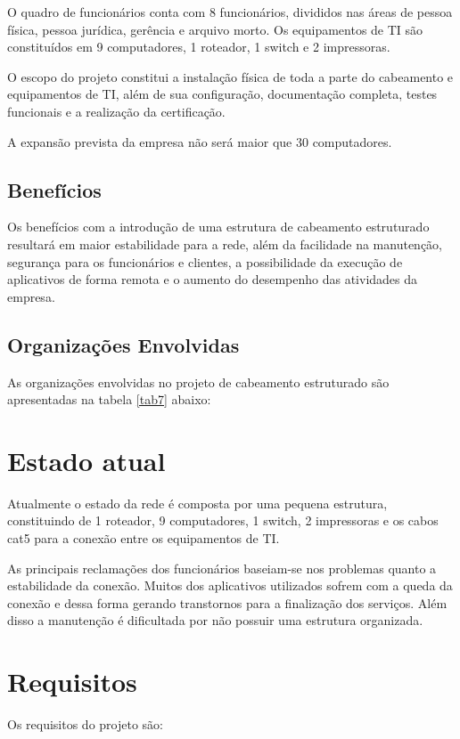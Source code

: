 \documentclass[	DIV=calc,%
							paper=a4,%
							fontsize=12pt,%
							onecolumn]{scrartcl}	 					%
\begin{document}
O quadro de funcionários conta com 8 funcionários, divididos nas áreas de pessoa física, pessoa jurídica, gerência e arquivo morto. Os equipamentos de TI são constituídos em 9 computadores, 1 roteador, 1 switch e 2 impressoras. 

O escopo do projeto constitui a instalação física de toda a parte do cabeamento e equipamentos de TI, além de sua configuração, documentação completa, testes funcionais e a realização da certificação.

A expansão prevista da empresa não será maior que 30 computadores.

\subsection{Benefícios}
Os benefícios com a introdução de uma estrutura de cabeamento estruturado resultará em maior estabilidade para a rede, além da facilidade na manutenção, segurança para os funcionários e clientes, a possibilidade da execução de aplicativos de forma remota e o aumento do desempenho das atividades da empresa. 

\subsection{Organizações Envolvidas}
As organizações envolvidas no projeto de cabeamento estruturado são apresentadas na tabela \ref{tab7} abaixo:



\section{Estado atual}

Atualmente o estado da rede é composta por uma pequena estrutura, constituindo de 1 roteador, 9 computadores, 1 switch, 2 impressoras e os cabos cat5 para a conexão entre os equipamentos de TI.

As principais reclamações dos funcionários baseiam-se nos problemas quanto a estabilidade da conexão. Muitos dos aplicativos utilizados sofrem com a queda da conexão e dessa forma gerando transtornos para a finalização dos serviços. Além disso a manutenção é dificultada por não possuir uma estrutura organizada.

\section{Requisitos}

Os requisitos do projeto são:
\end{document}

